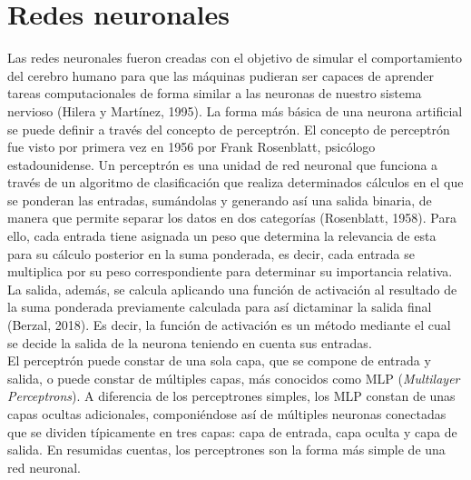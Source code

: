 \section{Redes neuronales}

Las redes neuronales fueron creadas con el objetivo de simular el comportamiento del cerebro humano para que las máquinas pudieran ser capaces de aprender tareas computacionales de forma similar a las neuronas de nuestro sistema nervioso (Hilera y Martínez, 1995). La forma más básica de una neurona artificial se puede definir a través del concepto de perceptrón. El concepto de perceptrón fue visto por primera vez en 1956 por Frank Rosenblatt, psicólogo estadounidense. Un perceptrón es una unidad de red neuronal que funciona a través de un algoritmo de clasificación que realiza determinados cálculos en el que se ponderan las entradas, sumándolas y generando así una salida binaria, de manera que permite separar los datos en dos categorías (Rosenblatt, 1958). Para ello, cada entrada tiene asignada un peso que determina la relevancia de esta para su cálculo posterior en la suma ponderada, es decir, cada entrada se multiplica por su peso correspondiente para determinar su importancia relativa. La salida, además, se calcula aplicando una función de activación al resultado de la suma ponderada previamente calculada para así dictaminar la salida final (Berzal, 2018). Es decir, la función de activación es un método mediante el cual se decide la salida de la neurona teniendo en cuenta sus entradas.\\

El perceptrón puede constar de una sola capa, que se compone de entrada y salida, o puede constar de múltiples capas, más conocidos como MLP (\textit{Multilayer Perceptrons}). A diferencia de los perceptrones simples, los MLP constan de unas capas ocultas adicionales, componiéndose así de múltiples neuronas conectadas que se dividen típicamente en tres capas: capa de entrada, capa oculta y capa de salida. En resumidas cuentas, los perceptrones son la forma más simple de una red neuronal.\\

